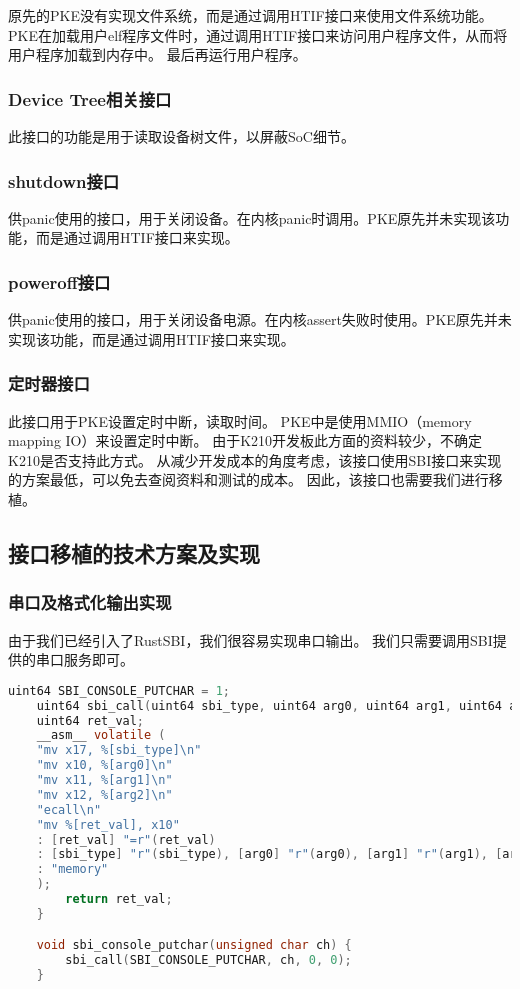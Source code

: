 原先的PKE没有实现文件系统，而是通过调用HTIF接口来使用文件系统功能。
PKE在加载用户elf程序文件时，通过调用HTIF接口来访问用户程序文件，从而将用户程序加载到内存中。
最后再运行用户程序。

\subsubsection{Device Tree相关接口}

此接口的功能是用于读取设备树文件，以屏蔽SoC细节。

\subsubsection{shutdown接口}

供panic使用的接口，用于关闭设备。在内核panic时调用。PKE原先并未实现该功能，而是通过调用HTIF接口来实现。

\subsubsection{poweroff接口}

供panic使用的接口，用于关闭设备电源。在内核assert失败时使用。PKE原先并未实现该功能，而是通过调用HTIF接口来实现。

\subsubsection{定时器接口}

此接口用于PKE设置定时中断，读取时间。
PKE中是使用MMIO（memory mapping IO）来设置定时中断。
由于K210开发板此方面的资料较少，不确定K210是否支持此方式。
从减少开发成本的角度考虑，该接口使用SBI接口来实现的方案最低，可以免去查阅资料和测试的成本。
因此，该接口也需要我们进行移植。

\subsection{接口移植的技术方案及实现}

\subsubsection{串口及格式化输出实现}

由于我们已经引入了RustSBI，我们很容易实现串口输出。
我们只需要调用SBI提供的串口服务即可。

\begin{lstlisting}[language=C, caption={串口实现代码}, label={lst:serial_output} ]
    uint64 SBI_CONSOLE_PUTCHAR = 1;
    uint64 sbi_call(uint64 sbi_type, uint64 arg0, uint64 arg1, uint64 arg2) {
    uint64 ret_val;
    __asm__ volatile (
    "mv x17, %[sbi_type]\n"
    "mv x10, %[arg0]\n"
    "mv x11, %[arg1]\n"
    "mv x12, %[arg2]\n"
    "ecall\n"
    "mv %[ret_val], x10"
    : [ret_val] "=r"(ret_val)
    : [sbi_type] "r"(sbi_type), [arg0] "r"(arg0), [arg1] "r"(arg1), [arg2] "r"(arg2)
    : "memory"
    );
        return ret_val;
    }

    void sbi_console_putchar(unsigned char ch) {
        sbi_call(SBI_CONSOLE_PUTCHAR, ch, 0, 0);
    }
\end{lstlisting}

